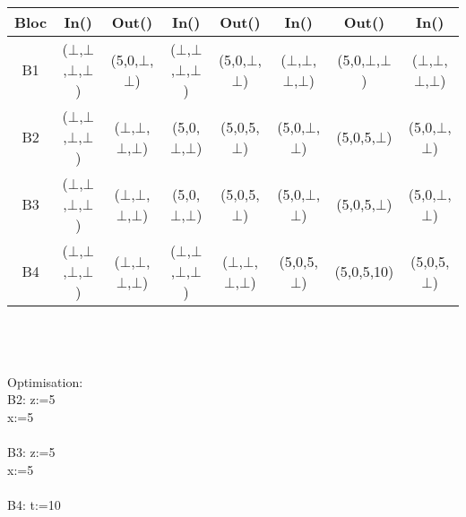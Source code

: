 \documentclass[10pt,a4paper]{article}
\begin{document}
\begin{tabular}{|c|c|c|c|c|c|c|c|}
\hline 
Bloc & In() & Out() & In() & Out() & In() & Out() & In() \\ 
\hline 
B1 & ($\bot$,$\bot$,$\bot$,$\bot$) & (5,0,$\bot$,$\bot$) & ($\bot$,$\bot$,$\bot$,$\bot$) & (5,0,$\bot$,$\bot$) & ($\bot$,$\bot$,$\bot$,$\bot$) & (5,0,$\bot$,$\bot$) & ($\bot$,$\bot$,$\bot$,$\bot$) \\ 
\hline 
B2 & ($\bot$,$\bot$,$\bot$,$\bot$) & ($\bot$,$\bot$,$\bot$,$\bot$) & (5,0,$\bot$,$\bot$) & (5,0,5,$\bot$) & (5,0,$\bot$,$\bot$) & (5,0,5,$\bot$) & (5,0,$\bot$,$\bot$) \\ 
\hline 
B3 & ($\bot$,$\bot$,$\bot$,$\bot$) & ($\bot$,$\bot$,$\bot$,$\bot$) & (5,0,$\bot$,$\bot$) & (5,0,5,$\bot$) & (5,0,$\bot$,$\bot$) & (5,0,5,$\bot$) & (5,0,$\bot$,$\bot$) \\ 
\hline 
B4 & ($\bot$,$\bot$,$\bot$,$\bot$) & ($\bot$,$\bot$,$\bot$,$\bot$) & ($\bot$,$\bot$,$\bot$,$\bot$) & ($\bot$,$\bot$,$\bot$,$\bot$) & (5,0,5,$\bot$) & (5,0,5,10) & (5,0,5,$\bot$) \\ 
\hline 
\end{tabular} \\\\
\\
Optimisation:\\
B2: z:=5\\
x:=5\\
\\
B3: z:=5\\
x:=5\\
\\
B4: t:=10 \\\\
\end{document}
